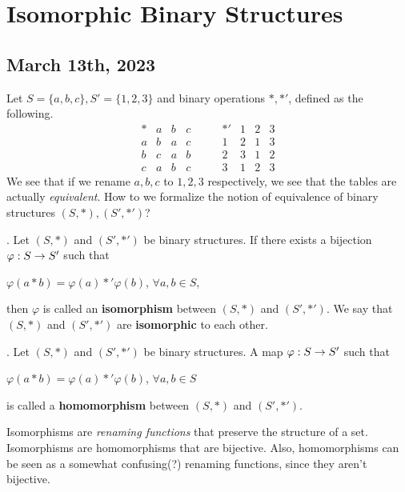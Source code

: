 \chapter{Isomorphic Binary Structures}

\section*{March 13th, 2023}

Let \(S = \{a, b, c\}, S' = \{1, 2, 3\}\) and binary operations \(*, *'\), defined as the following.
\[
    \begin{array}{c|ccc}
        * & a & b & c \\ \hline
        a & b & a & c \\
        b & c & a & b \\
        c & a & b & c
    \end{array}
    \qquad
    \begin{array}{c|ccc}
        *' & 1 & 2 & 3 \\ \hline
        1  & 2 & 1 & 3 \\
        2  & 3 & 1 & 2 \\
        3  & 1 & 2 & 3
    \end{array}
\]
We see that if we rename \(a, b, c\) to \(1, 2, 3\) respectively, we see that the tables are actually \textit{equivalent}. How to we formalize the notion of equivalence of binary structures \((S, *), (S', *')\)?

.  Let \((S, *)\) and \((S', *')\) be binary structures. If there exists a bijection \(\varphi: S \rightarrow S'\) such that
\begin{center}
    \(\varphi(a * b) = \varphi(a) *' \varphi(b)\), \quad \(\forall a, b \in S\),
\end{center}
then \(\varphi\) is called an \textbf{isomorphism} between \((S, *)\) and \((S', *')\). We say that \((S, *)\) and \((S', *')\) are \textbf{isomorphic} to each other.

.  Let \((S, *)\) and \((S', *')\) be binary structures. A map \(\varphi: S \rightarrow S'\) such that
\begin{center}
    \(\varphi(a * b) = \varphi(a) *' \varphi(b)\), \quad \(\forall a, b \in S\)
\end{center}
is called a \textbf{homomorphism} between \((S, *)\) and \((S', *')\).

\rmk Isomorphisms are \textit{renaming functions} that preserve the structure of a set. Isomorphisms are homomorphisms that are bijective. Also, homomorphisms can be seen as a somewhat confusing(?) renaming functions, since they aren't bijective.

